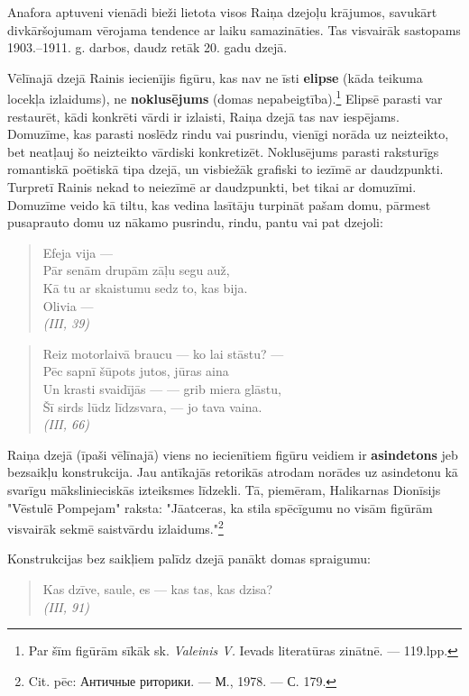 \documentclass[11pt]{article}
\begin{document}
Anafora aptuveni vienādi bieži lietota visos
Raiņa dzejoļu krājumos, savukārt divkāršojumam
vērojama tendence ar laiku samazināties.
Tas visvairāk sastopams 1903.--1911. g. darbos,
daudz retāk 20. gadu dzejā.

Vēlīnajā dzejā Rainis iecienījis figūru, kas nav
ne īsti {\bf elipse} (kāda teikuma locekļa
izlaidums), ne {\bf noklusējums} (domas
nepabeigtība).\footnote{Par šīm figūrām sīkāk sk.
{\em Valeinis V.} Ievads literatūras zinātnē. --- 119.lpp.}
Elipsē parasti var restaurēt, kādi konkrēti
vārdi ir izlaisti, Raiņa dzejā tas nav iespējams.
Domuzīme, kas parasti noslēdz rindu vai pusrindu,
vienīgi norāda uz neizteikto, bet neatļauj
šo neizteikto vārdiski konkretizēt.
Noklusējums parasti raksturīgs romantiskā
poētiskā tipa dzejā, un visbiežāk grafiski to
iezīmē ar daudzpunkti. Turpretī Rainis nekad to
neiezīmē ar daudzpunkti, bet tikai ar domuzīmi.
Domuzīme veido kā tiltu, kas vedina lasītāju turpināt
pašam domu, pārmest pusaprauto domu uz nākamo pusrindu,
rindu, pantu vai pat dzejoli:

\begin{quote}
Efeja vija ---\\
Pār senām drupām zāļu segu auž,\\
Kā tu ar skaistumu sedz to, kas bija.\\
Olivia ---\\
{\em (III, 39)}
\end{quote}

\begin{quote}
Reiz motorlaivā braucu --- ko lai stāstu? ---\\
Pēc sapnī šūpots jutos, jūras aina\\
Un krasti svaidījās --- --- grib miera glāstu,\\
Šī sirds lūdz līdzsvara, --- jo tava vaina.\\
{\em (III, 66)}
\end{quote}

Raiņa dzejā (īpaši vēlīnajā) viens no iecienītiem
figūru veidiem ir {\bf asindetons} jeb bezsaikļu
konstrukcija. Jau antīkajās retorikās atrodam
norādes uz asindetonu kā svarīgu mākslinieciskās
izteiksmes līdzekli. Tā, piemēram, Halikarnas
Dionīsijs "Vēstulē Pompejam" raksta:
"Jāatceras, ka stila spēcīgumu no visām figūrām
visvairāk sekmē saistvārdu izlaidums."\footnote{Cit.
pēc: Античные риторики. --- М., 1978. --- С. 179.}

Konstrukcijas bez saikļiem palīdz dzejā panākt domas
spraigumu:

\begin{quote}
Kas dzīve, saule, es --- kas tas, kas dzisa?\\
{\em (III, 91)}
\end{quote}
\end{document}
